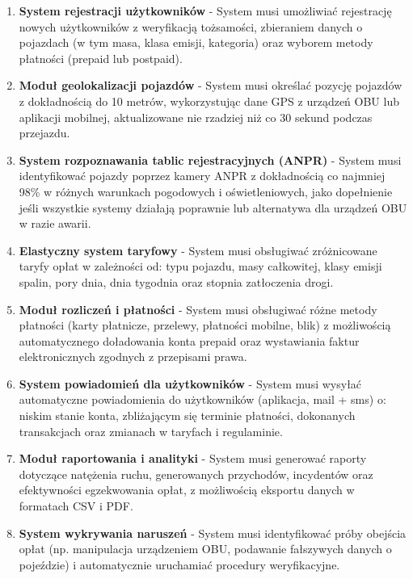 \begin{enumerate}
    \item \textbf{System rejestracji użytkowników} - System musi umożliwiać rejestrację nowych użytkowników z weryfikacją tożsamości, zbieraniem danych o pojazdach (w tym masa, klasa emisji, kategoria) oraz wyborem metody płatności (prepaid lub postpaid).

    \item \textbf{Moduł geolokalizacji pojazdów} - System musi określać pozycję pojazdów z dokładnością do 10 metrów, wykorzystując dane GPS z urządzeń OBU lub aplikacji mobilnej, aktualizowane nie rzadziej niż co 30 sekund podczas przejazdu.

    \item \textbf{System rozpoznawania tablic rejestracyjnych (ANPR)} - System musi identyfikować pojazdy poprzez kamery ANPR z dokładnością co najmniej 98\% w różnych warunkach pogodowych i oświetleniowych, jako dopełnienie jeśli wszystkie systemy działają poprawnie lub alternatywa dla urządzeń OBU w razie awarii.

    \item \textbf{Elastyczny system taryfowy} - System musi obsługiwać zróżnicowane taryfy opłat w zależności od: typu pojazdu, masy całkowitej, klasy emisji spalin, pory dnia, dnia tygodnia oraz stopnia zatłoczenia drogi.

    \item \textbf{Moduł rozliczeń i płatności} - System musi obsługiwać różne metody płatności (karty płatnicze, przelewy, płatności mobilne, blik) z możliwością automatycznego doładowania konta prepaid oraz wystawiania faktur elektronicznych zgodnych z przepisami prawa.

    \item \textbf{System powiadomień dla użytkowników} - System musi wysyłać automatyczne powiadomienia do użytkowników (aplikacja, mail + sms) o: niskim stanie konta, zbliżającym się terminie płatności, dokonanych transakcjach oraz zmianach w taryfach i regulaminie.

    \item \textbf{Moduł raportowania i analityki} - System musi generować raporty dotyczące natężenia ruchu, generowanych przychodów, incydentów oraz efektywności egzekwowania opłat, z możliwością eksportu danych w formatach CSV i PDF.

    \item \textbf{System wykrywania naruszeń} - System musi identyfikować próby obejścia opłat (np. manipulacja urządzeniem OBU, podawanie fałszywych danych o pojeździe) i automatycznie uruchamiać procedury weryfikacyjne.


\end{enumerate}
